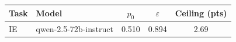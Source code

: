 \begin{tabular}{@{}ll ccc@{}}
\toprule
Task & Model & $p_0$ & $\varepsilon$ & Ceiling (pts) \\
\midrule
IE & qwen-2.5-72b-instruct & 0.510 & 0.894 & 2.69 \\
\bottomrule
\end{tabular}
